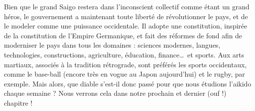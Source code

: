 Bien que le grand Saigo restera dans l'inconscient collectif comme étant un
grand héros, le gouvernement a maintenant toute liberté de révolutionner le
pays, et de le modeler comme une puissance occidentale. Il adopte une
constitution, inspirée de la constitution de l'Empire Germanique, et fait des
réformes de fond afin de moderniser le pays dans tous les domaines : sciences
modernes, langues, technologies, constructions, agriculture, éducation,
finance\dots\ et sports. Aux arts martiaux, associés à la tradition
rétrograde, sont préférés les sports occidentaux, comme le base-ball (encore
très en vogue au Japon aujourd'hui) et le rugby, par exemple. Mais alors, que
diable s'est-il donc passé pour que nous étudions l'aikido chaque semaine ?
Nous verrons cela dans notre prochain et dernier (ouf !) chapitre !
